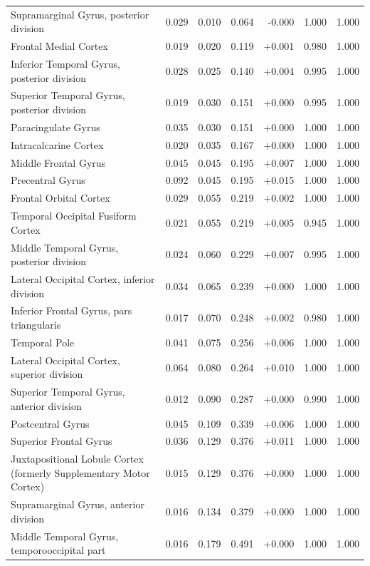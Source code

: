 \documentclass[11pt]{article}
\begin{document}
{\begin{longtable}{>{\raggedright\arraybackslash}p{6.4cm}rrrrrr}
Supramarginal Gyrus, posterior division & 0.029 & 0.010 & 0.064 & -0.000 & 1.000 & 1.000 \\
Frontal Medial Cortex & 0.019 & 0.020 & 0.119 & +0.001 & 0.980 & 1.000 \\
Inferior Temporal Gyrus, posterior division & 0.028 & 0.025 & 0.140 & +0.004 & 0.995 & 1.000 \\
Superior Temporal Gyrus, posterior division & 0.019 & 0.030 & 0.151 & +0.000 & 0.995 & 1.000 \\
Paracingulate Gyrus & 0.035 & 0.030 & 0.151 & +0.000 & 1.000 & 1.000 \\
Intracalcarine Cortex & 0.020 & 0.035 & 0.167 & +0.000 & 1.000 & 1.000 \\
Middle Frontal Gyrus & 0.045 & 0.045 & 0.195 & +0.007 & 1.000 & 1.000 \\
Precentral Gyrus & 0.092 & 0.045 & 0.195 & +0.015 & 1.000 & 1.000 \\
Frontal Orbital Cortex & 0.029 & 0.055 & 0.219 & +0.002 & 1.000 & 1.000 \\
Temporal Occipital Fusiform Cortex & 0.021 & 0.055 & 0.219 & +0.005 & 0.945 & 1.000 \\
Middle Temporal Gyrus, posterior division & 0.024 & 0.060 & 0.229 & +0.007 & 0.995 & 1.000 \\
Lateral Occipital Cortex, inferior division & 0.034 & 0.065 & 0.239 & +0.000 & 1.000 & 1.000 \\
Inferior Frontal Gyrus, pars triangularis & 0.017 & 0.070 & 0.248 & +0.002 & 0.980 & 1.000 \\
Temporal Pole & 0.041 & 0.075 & 0.256 & +0.006 & 1.000 & 1.000 \\
Lateral Occipital Cortex, superior division & 0.064 & 0.080 & 0.264 & +0.010 & 1.000 & 1.000 \\
Superior Temporal Gyrus, anterior division & 0.012 & 0.090 & 0.287 & +0.000 & 0.990 & 1.000 \\
Postcentral Gyrus & 0.045 & 0.109 & 0.339 & +0.006 & 1.000 & 1.000 \\
Superior Frontal Gyrus & 0.036 & 0.129 & 0.376 & +0.011 & 1.000 & 1.000 \\
Juxtapositional Lobule Cortex (formerly Supplementary Motor Cortex) & 0.015 & 0.129 & 0.376 & +0.000 & 1.000 & 1.000 \\
Supramarginal Gyrus, anterior division & 0.016 & 0.134 & 0.379 & +0.000 & 1.000 & 1.000 \\
Middle Temporal Gyrus, temporooccipital part & 0.016 & 0.179 & 0.491 & +0.000 & 1.000 & 1.000 \\

\end{longtable}}
\end{document}
